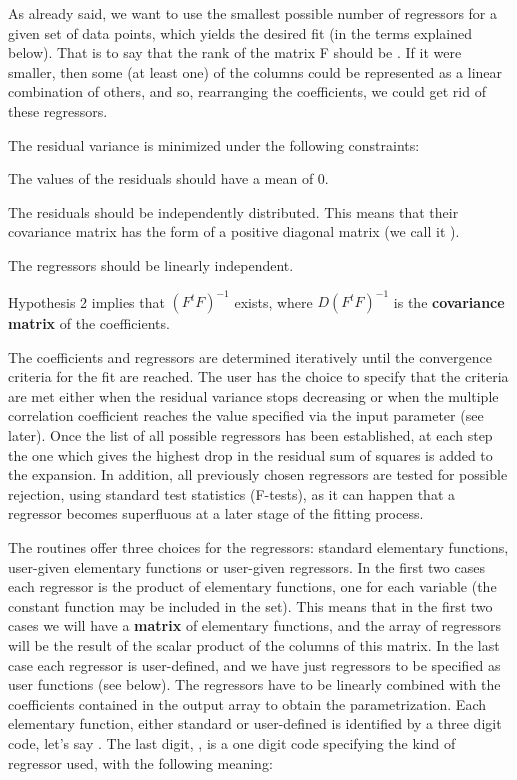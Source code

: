 As already said, we want to use the smallest possible number of regressors
for a given set of data points, which yields the desired fit (in the
terms explained below).
That is to say that the rank of the matrix F should be .
If it were smaller, then some (at least one) of the columns
could be represented as a linear combination of others, and so, rearranging
the coefficients, we could get rid of these regressors.
 
The residual variance is minimized under the following constraints:
\begin{OL}
\item The  values of the residuals should have a mean of 0.
\item The residuals should be independently distributed.
This means that their covariance matrix has the form of a positive
diagonal matrix (we call it ).
\item The regressors should be linearly independent.
\end{OL}
Hypothesis 2 implies that $(F^t F)^{-1}$ exists, where
$D (F^t F)^{-1}$ is the {\bf covariance matrix} of the coefficients.
 
The coefficients and regressors are determined iteratively until the
convergence criteria for the fit are reached.
The user has the choice to specify
that the criteria are met either when the residual variance stops
decreasing or when the multiple correlation coefficient reaches the
value specified via the input parameter  (see later).
Once the list of all possible regressors has been established,
at each step the one which gives the highest drop in
the residual sum of squares is added to the expansion.
In addition, all previously chosen regressors are tested for
possible rejection, using standard test statistics (F-tests),
as it can happen that a regressor becomes superfluous
at a later stage of the fitting process.
 
The routines offer three choices for the regressors: standard
elementary functions, user-given elementary functions or user-given regressors.
In the first two cases each regressor is the product of  elementary
functions, one for each variable (the constant function may be included
in the set).
This means that in the first two cases we will have a {\bf matrix} of
 elementary functions, and the array of regressors will
be the result of the scalar product of the  columns of this
matrix.
In the last case each regressor is user-defined, and we have just
 regressors to be specified as user functions (see below).
The 
regressors have to be linearly combined with the  coefficients
contained in the output array  to obtain the parametrization.
Each elementary function, either standard or user-defined is identified
by a three digit code, let's say  .
The last digit, , is a one digit
code specifying the kind of regressor used, with the following meaning:

